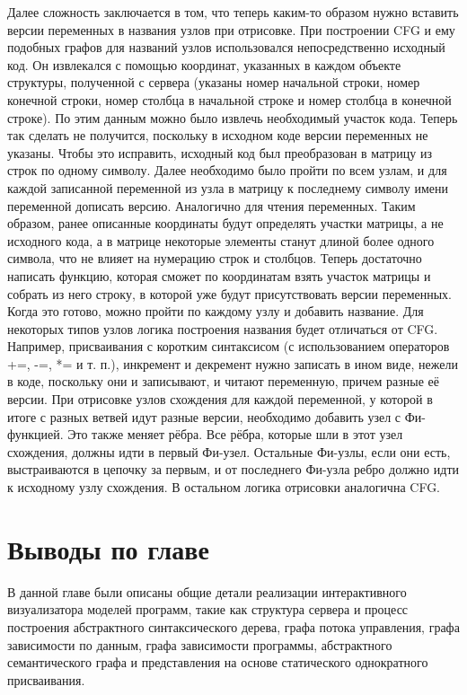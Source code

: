 Далее сложность заключается в том, что теперь каким-то образом нужно вставить версии переменных в названия узлов при отрисовке. При построении CFG и ему подобных графов для названий узлов использовался непосредственно исходный код. Он извлекался с помощью координат, указанных в каждом объекте структуры, полученной с сервера (указаны номер начальной строки, номер конечной строки, номер столбца в начальной строке и номер столбца в конечной строке). По этим данным можно было извлечь необходимый участок кода. Теперь так сделать не получится, поскольку в исходном коде версии переменных не указаны. Чтобы это исправить, исходный код был преобразован в матрицу из строк по одному символу. Далее необходимо было пройти по всем узлам, и для каждой записанной переменной из узла в матрицу к последнему символу имени переменной дописать версию. Аналогично для чтения переменных. Таким образом, ранее описанные координаты будут определять участки матрицы, а не исходного кода, а в матрице некоторые элементы станут длиной более одного символа, что не влияет на нумерацию строк и столбцов. Теперь достаточно написать функцию, которая сможет по координатам взять участок матрицы и собрать из него строку, в которой уже будут присутствовать версии переменных. Когда это готово, можно пройти по каждому узлу и добавить название. Для некоторых типов узлов логика построения названия будет отличаться от CFG. Например, присваивания с коротким синтаксисом (с использованием операторов +=, -=, *= и т. п.), инкремент и декремент нужно записать в ином виде, нежели в коде, поскольку они и записывают, и читают переменную, причем разные её версии.
При отрисовке узлов схождения для каждой переменной, у которой в итоге с разных ветвей идут разные версии, необходимо добавить узел с Фи-функцией. Это также меняет рёбра. Все рёбра, которые шли в этот узел схождения, должны идти в первый Фи-узел. Остальные Фи-узлы, если они есть, выстраиваются в цепочку за первым, и от последнего Фи-узла ребро должно идти к исходному узлу схождения. В остальном логика отрисовки аналогична CFG.
\section{Выводы по главе} \label{ch5:sec3}
В данной главе были описаны общие детали реализации интерактивного визуализатора моделей программ, такие как структура сервера и процесс построения абстрактного синтаксического дерева, графа потока управления, графа зависимости по данным, графа зависимости программы, абстрактного семантического графа и представления на основе статического однократного присваивания.
\newpage